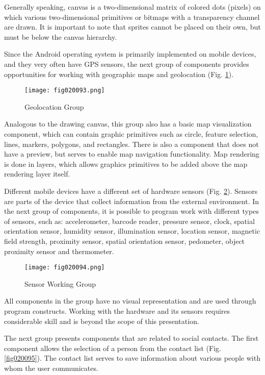Generally speaking, canvas is a two-dimensional matrix of colored dots (pixels) on which various two-dimensional primitives or bitmaps with a transparency channel are drawn. It is important to note that sprites cannot be placed on their own, but must be below the canvas hierarchy.

Since the Android operating system is primarily implemented on mobile devices, and they very often have GPS sensors, the next group of components provides opportunities for working with geographic maps and geolocation (Fig. \ref{fig020093}).

\begin{figure}[H]
   \centering
   \texttt{[image: fig020093.png]}
   \caption{Geolocation Group}
\label{fig020093}
\end{figure}

Analogous to the drawing canvas, this group also has a basic map visualization component, which can contain graphic primitives such as circle, feature selection, lines, markers, polygons, and rectangles. There is also a component that does not have a preview, but serves to enable map navigation functionality. Map rendering is done in layers, which allows graphics primitives to be added above the map rendering layer itself.

Different mobile devices have a different set of hardware sensors (Fig. \ref{fig020094}). Sensors are parts of the device that collect information from the external environment. In the next group of components, it is possible to program work with different types of sensors, such as: accelerometer, barcode reader, pressure sensor, clock, spatial orientation sensor, humidity sensor, illumination sensor, location sensor, magnetic field strength, proximity sensor, spatial orientation sensor, pedometer, object proximity sensor and thermometer.

\begin{figure}[H]
   \centering
   \texttt{[image: fig020094.png]}
   \caption{Sensor Working Group}
\label{fig020094}
\end{figure}

All components in the group have no visual representation and are used through program constructs. Working with the hardware and its sensors requires considerable skill and is beyond the scope of this presentation.

The next group presents components that are related to social contacts. The first component allows the selection of a person from the contact list (Fig. \ref{fig020095}). The contact list serves to save information about various people with whom the user communicates.

